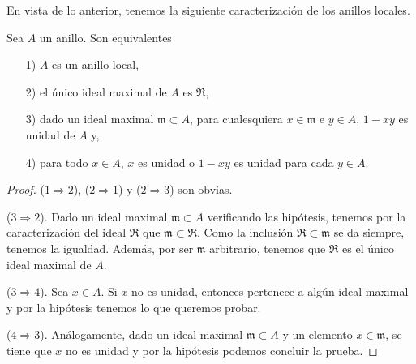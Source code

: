 \documentclass[./main.tex]{subfiles}
\begin{document}
	En vista de lo anterior, tenemos la siguiente caracterización de los anillos locales.
	\begin{proposition}
		Sea $A$ un anillo. Son equivalentes
		\begin{itemize}
			\item[1)] $A$ es un anillo local,
			\item[2)] el único ideal maximal de $A$ es $\mathfrak R$,
			\item[3)] dado un ideal maximal $\mathfrak m\subset A$, para cualesquiera $x\in\mathfrak m$ e $y\in A$, $1-xy$ es unidad de $A$ y,
			\item[4)] para todo $x\in A$, $x$ es unidad o $1-xy$ es unidad para cada $y\in A$.
		\end{itemize}
	\end{proposition}
	\begin{proof}


		($1\Rightarrow2$), ($2\Rightarrow1$) y ($2\Rightarrow 3$) son obvias.

		($3\Rightarrow2$). Dado un ideal maximal $\mathfrak m\subset A$ verificando las hipótesis, tenemos por la caracterización del ideal $\mathfrak R$ que $\mathfrak m\subset \mathfrak R$. Como la inclusión $\mathfrak R\subset \mathfrak m$ se da siempre, tenemos la igualdad. Además, por ser $\mathfrak m$ arbitrario, tenemos que $\mathfrak R$ es el único ideal maximal de $A$.

		($3\Rightarrow 4$). Sea $x\in A$. Si $x$ no es unidad, entonces pertenece a algún ideal maximal y por la hipótesis tenemos lo que queremos probar.

		($4\Rightarrow 3$). Análogamente, dado un ideal maximal $\mathfrak m\subset A$ y un elemento $x\in\mathfrak m$, se tiene que $x$ no es unidad y por la hipótesis podemos concluir la prueba.

	\end{proof}
\end{document}
